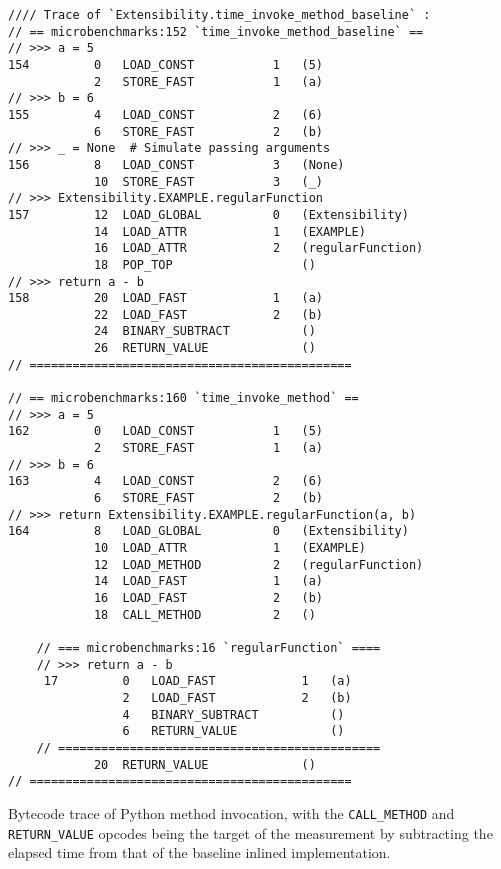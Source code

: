 \vspace{2em}
\begin{code}
    \begin{verbatim}
//// Trace of `Extensibility.time_invoke_method_baseline` :
// == microbenchmarks:152 `time_invoke_method_baseline` ==
// >>> a = 5
154         0   LOAD_CONST           1   (5)
            2   STORE_FAST           1   (a)
// >>> b = 6
155         4   LOAD_CONST           2   (6)
            6   STORE_FAST           2   (b)
// >>> _ = None  # Simulate passing arguments
156         8   LOAD_CONST           3   (None)
            10  STORE_FAST           3   (_)
// >>> Extensibility.EXAMPLE.regularFunction
157         12  LOAD_GLOBAL          0   (Extensibility)
            14  LOAD_ATTR            1   (EXAMPLE)
            16  LOAD_ATTR            2   (regularFunction)
            18  POP_TOP                  ()
// >>> return a - b
158         20  LOAD_FAST            1   (a)
            22  LOAD_FAST            2   (b)
            24  BINARY_SUBTRACT          ()
            26  RETURN_VALUE             ()
// =============================================

// == microbenchmarks:160 `time_invoke_method` ==
// >>> a = 5
162         0   LOAD_CONST           1   (5)
            2   STORE_FAST           1   (a)
// >>> b = 6
163         4   LOAD_CONST           2   (6)
            6   STORE_FAST           2   (b)
// >>> return Extensibility.EXAMPLE.regularFunction(a, b)
164         8   LOAD_GLOBAL          0   (Extensibility)
            10  LOAD_ATTR            1   (EXAMPLE)
            12  LOAD_METHOD          2   (regularFunction)
            14  LOAD_FAST            1   (a)
            16  LOAD_FAST            2   (b)
            18  CALL_METHOD          2   ()

    // === microbenchmarks:16 `regularFunction` ====
    // >>> return a - b
     17         0   LOAD_FAST            1   (a)
                2   LOAD_FAST            2   (b)
                4   BINARY_SUBTRACT          ()
                6   RETURN_VALUE             ()
    // =============================================
            20  RETURN_VALUE             ()
// =============================================
    \end{verbatim}
    \caption{Bytecode trace of Python method invocation, with the \texttt{CALL\_METHOD} and \texttt{RETURN\_VALUE} opcodes being the target of the measurement by subtracting the elapsed time from that of the baseline inlined implementation.}
    \label{listing:impact-dispatch-python-disassembly}
\end{code}
